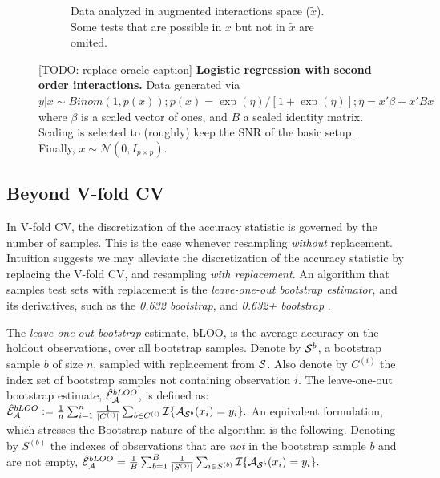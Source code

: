 \documentclass[]{bio}
\begin{document}
\begin{figure}[th]
\begin{subfigure}[t]{.45\columnwidth}
		\caption{Data analyzed in augmented interactions space ($\tilde x$).
		Some tests that are possible in $x$ but not in $\tilde{x}$ are omited.}
		\label{fig:interactions-in-augmented-space}
	\end{subfigure}
	\caption{[TODO: replace oracle caption]
		\textbf{Logistic regression with second order interactions.} 
		Data generated via $y|x \sim Binom(1,p(x));
		p(x)=\exp(\eta)/[1+\exp(\eta)];
		\eta=x'\beta+x'Bx$ where 
		$\beta$ is a scaled vector of ones, and $B$ a scaled identity matrix.
		Scaling is selected to (roughly) keep the SNR of the basic setup. 
		Finally, $x\sim \mathcal{N}(0,I_{p\times p})$.
	 } 
	\label{fig:logistic-main-and-interactions}
\end{figure}





\subsection{Beyond V-fold CV}
\label{sec:bootstrap}

In V-fold CV, the discretization of the accuracy statistic is governed by the number of samples. 
This is the case whenever resampling \emph{without} replacement. 
Intuition suggests we may alleviate the discretization of the accuracy statistic by replacing the V-fold CV, and resampling \emph{with replacement}.
An algorithm that samples test sets with replacement is the \emph{leave-one-out bootstrap estimator},  and its derivatives, such as the \emph{0.632 bootstrap}, and \emph{0.632+ bootstrap} \citep[Sec 7.11]{hastie_elements_2003}.
\begin{definition}[bLOO]
	\label{def:bloo}
	The \emph{leave-one-out bootstrap} estimate, bLOO, is the average accuracy on the holdout observations, over all bootstrap samples. 
	Denote by $\mathcal{S}^b$, a bootstrap sample $b$ of size $n$, sampled with replacement from $\mathcal{S}$. 
	Also denote by $C^{(i)}$ the index set of bootstrap samples not containing observation $i$.
	The leave-one-out bootstrap estimate, $\hat{\mathcal{E}}_{\mathcal{A}}^{bLOO}$,  is defined as:
	$\hat{\mathcal{E}}_{\mathcal{A}}^{bLOO}:= \frac 1n \sum_{i=1}^{n} \frac{1}{|C^{(i)}|} \sum_{b \in C^{(i)}} \mathcal{I}{\{ \mathcal{A}_{\mathcal{S}^b}(x_i)=y_i \}}.$
	An equivalent formulation, which stresses the Bootstrap nature of the algorithm is the following. 
	Denoting by $S^{(b)}$ the indexes of observations that are \emph{not} in the bootstrap sample $b$ and are not empty, 
	$\hat{\mathcal{E}}_{\mathcal{A}}^{bLOO} = \frac 1B \sum_{b=1}^{B} \frac{1}{|S^{(b)}|} \sum_{i \in S^{(b)}} \mathcal{I}{\{ \mathcal{A}_{\mathcal{S}^b}(x_i)=y_i \}}.$
\end{definition}
\end{document}
